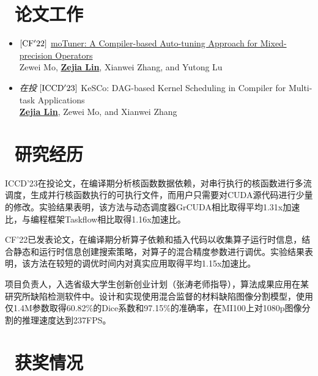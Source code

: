 \documentclass{resume}
\begin{document}
\vspace*{1em}

\section{\faBook\ 论文工作}

\begin{itemize}[parsep=0.5ex]
  \item $\rm{[CF'22]}$ \href{https://dl.acm.org/doi/10.1145/3528416.3530231}{moTuner: A Compiler-based Auto-tuning Approach for Mixed-precision Operators} \\ Zewei Mo, \underline{\textbf{Zejia Lin}}, Xianwei Zhang, and Yutong Lu
  \item \textit{在投} $[\rm{ICCD'23}]$ KeSCo: DAG-based Kernel Scheduling in Compiler for Multi-task Applications \\ \underline{\textbf{Zejia Lin}}, Zewei Mo, and Xianwei Zhang
\end{itemize}

\section{\faSearch\ 研究经历}

ICCD'23在投论文，在编译期分析核函数数据依赖，对串行执行的核函数进行多流调度，生成并行核函数执行的可执行文件，而用户只需要对CUDA源代码进行少量的修改。实验结果表明，该方法与动态调度器GrCUDA相比取得平均1.31x加速比，与编程框架Taskflow相比取得1.16x加速比。


\vspace*{0.3em}
CF'22已发表论文，在编译期分析算子依赖和插入代码以收集算子运行时信息，结合静态和运行时信息创建搜索策略，对算子的混合精度参数进行调优。实验结果表明，该方法在较短的调优时间内对真实应用取得平均1.15x加速比。


\vspace*{0.3em}
项目负责人，入选省级大学生创新创业计划（张涛老师指导），算法成果应用在某研究所缺陷检测软件中。设计和实现使用混合监督的材料缺陷图像分割模型，使用仅1.4M参数取得60.82\%的Dice系数和97.15\%的准确率，在MI100上对1080p图像分割的推理速度达到237FPS。

\section{\faRocket\ 获奖情况}
\end{document}
